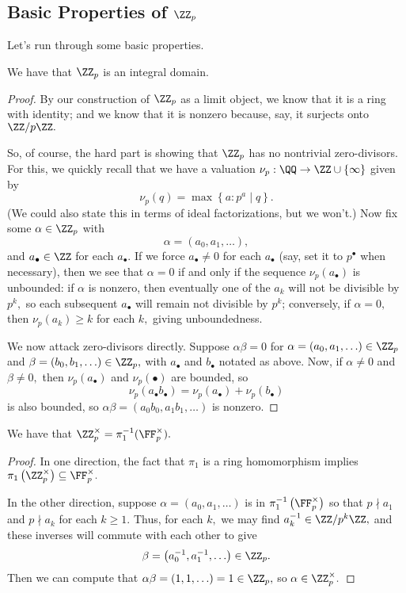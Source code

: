 \subsection{Basic Properties of \texorpdfstring{$\ZZ_p$}{}}
Let's run through some basic properties.
\begin{proposition}
	We have that $\ZZ_p$ is an integral domain.
\end{proposition}
\begin{proof}
	By our construction of $\ZZ_p$ as a limit object, we know that it is a ring with identity; and we know that it is nonzero because, say, it surjects onto $\ZZ/p\ZZ.$

	So, of course, the hard part is showing that $\ZZ_p$ has no nontrivial zero-divisors. For this, we quickly recall that we have a valuation $\nu_p:\QQ\to\ZZ\cup\{\infty\}$ given by
	\[\nu_p(q)=\max\left\{a:p^a\mid q\right\}.\]
	(We could also state this in terms of ideal factorizations, but we won't.) Now fix some $\alpha\in\ZZ_p$ with
	\[\alpha=(a_0,a_1,\ldots),\]
	and $a_\bullet\in\ZZ$ for each $a_\bullet.$ If we force $a_\bullet\ne0$ for each $a_\bullet$ (say, set it to $p^\bullet$ when necessary), then we see that $\alpha=0$ if and only if the sequence $\nu_p(a_\bullet)$ is unbounded: if $\alpha$ is nonzero, then eventually one of the $a_k$ will not be divisible by $p^k,$ so each subsequent $a_\bullet$ will remain not divisible by $p^k$; conversely, if $\alpha=0,$ then $\nu_p(a_k)\ge k$ for each $k,$ giving unboundedness.

	We now attack zero-divisors directly. Suppose $\alpha\beta=0$ for $\alpha=(a_0,a_1,\ldots)\in\ZZ_p$ and $\beta=(b_0,b_1,\ldots)\in\ZZ_p,$ with $a_\bullet$ and $b_\bullet$ notated as above. Now, if $\alpha\ne0$ and $\beta\ne0,$ then $\nu_p(a_\bullet)$ and $\nu_p(\bullet)$ are bounded, so
	\[\nu_p(a_\bullet b_\bullet)=\nu_p(a_\bullet)+\nu_p(b_\bullet)\]
	is also bounded, so $\alpha\beta=(a_0b_0,a_1b_1,\ldots)$ is nonzero.
\end{proof}
\begin{proposition}
	We have that $\ZZ_p^\times=\pi_1^{-1}(\FF_p^\times).$
\end{proposition}
\begin{proof}
	In one direction, the fact that $\pi_1$ is a ring homomorphism implies $\pi_1\left(\ZZ_p^\times\right)\subseteq\FF_p^\times.$

	In the other direction, suppose $\alpha=(a_0,a_1,\ldots)$ is in $\pi_1^{-1}\left(\FF_p^\times\right)$ so that $p\nmid a_1$ and $p\nmid a_k$ for each $k\ge1.$ Thus, for each $k,$ we may find $a_k^{-1}\in\ZZ/p^k\ZZ,$ and these inverses will commute with each other to give
	\[\beta=\left(a_0^{-1},a_1^{-1},\ldots\right)\in\ZZ_p.\]
	Then we can compute that $\alpha\beta=(1,1,\ldots)=1\in\ZZ_p,$ so $\alpha\in\ZZ_p^\times.$
\end{proof}

